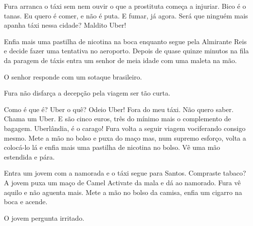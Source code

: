 \documentclass[12pt]{creativeWriting}
\begin{document}
Fura arranca o táxi sem nem ouvir o que a prostituta começa a injuriar. Bico é o tanas. Eu quero é comer, e não é puta. E fumar, já agora. Será que ninguém mais apanha táxi nessa cidade? Maldito Uber!

Enfia mais uma pastilha de nicotina na boca enquanto segue pela Almirante Reis e decide fazer uma tentativa no aeroporto. Depois de quase quinze minutos na fila da paragem de táxis entra um senhor de meia idade com uma maleta na mão.


 O senhor responde com um sotaque brasileiro.







 Fura não disfarça a decepção pela viagem ser tão curta. 


Como é que é? Uber o quê? Odeio Uber! Fora do meu táxi. Não quero saber. Chama um Uber. E são cinco euros, três do mínimo mais o complemento de bagagem. Uberlândia, é o carago! Fura volta a seguir viagem vociferando consigo mesmo. Mete a mão no bolso e puxa do maço mas, num supremo esforço, volta a colocá-lo lá e enfia mais uma pastilha de nicotina no bolso. Vê uma mão estendida e pára.

Entra um jovem com a namorada e o táxi segue para Santos. Compraste tabaco? A jovem puxa um maço de Camel Activate da mala e dá ao namorado. Fura vê aquilo e não aguenta mais. Mete a mão no bolso da camisa, enfia um cigarro na boca e acende.

 O jovem pergunta irritado. 


\end{document}
